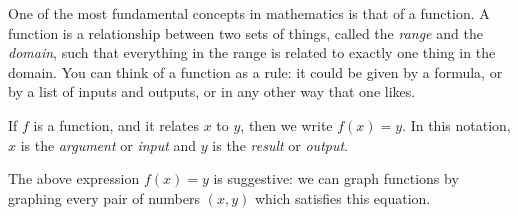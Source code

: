 



One of the most fundamental concepts in mathematics is that of a function. A function is a relationship between
two sets of things, called the \textit{range} and the \textit{domain}, such that everything in the range is
related to exactly one thing in the domain. You can think of a function as a rule: it could be given by a formula,
or by a list of inputs and outputs, or in any other way that one likes.

If $ f $ is a function, and it relates $ x $ to $ y $, then we write $ f(x) = y $. In this notation, $ x $ is the \emph{argument} or \emph{input}
and $ y $ is the \emph{result} or \emph{output}.

The above expression $ f(x) = y $ is suggestive: we can graph functions by graphing every pair of numbers $ (x,y) $
which satisfies this equation.

